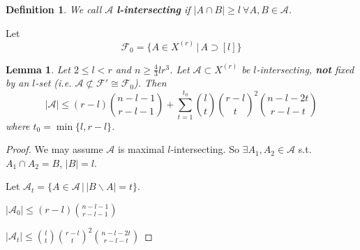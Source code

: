 \documentclass[a4paper]{article}
\newtheorem*{definition}{Definition}
\newtheorem{lemma}[theorem]{Lemma}
\newcommand*\abs[1]{\left|#1\right|}
\begin{document}
\begin{definition}
	We call $\mathcal{A}$ \textbf{l-intersecting} if $\abs{A \cap B} \geq l\ \forall A, B \in \mathcal{A}$.
\end{definition}

Let $$\mathcal{F}_0 = \{A \in X^{(r)} \,|\, A \supset [l] \}$$

\begin{lemma}
	Let $2 \leq l < r$ and $n \geq \frac{4}{3}lr^3$.
	Let $\mathcal{A} \subset X^{(r)}$ be $l$-intersecting,
	\textbf{not} fixed by an $l$-set (i.e. $\mathcal{A} \not\subset \mathcal{F}' \cong \mathcal{F}_0$).
	Then
	$$\abs{\mathcal{A}} \leq (r-l){n-l-1 \choose r-l-1} + \sum_{t=1}^{t_0} {l \choose t}{r-l \choose t}^2{n-l-2t \choose r-l-t}$$
	where $t_0 = \min\{l, r-l\}$.
\end{lemma}
\begin{proof}
	We may assume $\mathcal{A}$ is maximal $l$-intersecting.
	So $\exists A_1, A_2 \in \mathcal{A}$ s.t. $A_1 \cap A_2 = B$, $\abs{B} = l$.
	
	Let $\mathcal{A}_t = \{A \in \mathcal{A} \,|\, \abs{B \backslash A} = t \}$.
	
	$\abs{\mathcal{A}_0} \leq (r-l){n-l-1 \choose r-l-1}$
	
	$\abs{\mathcal{A}_t} \leq {l \choose t}{r-l \choose t}^2{n-l-2t \choose r-l-t}$
\end{proof}
\end{document}
